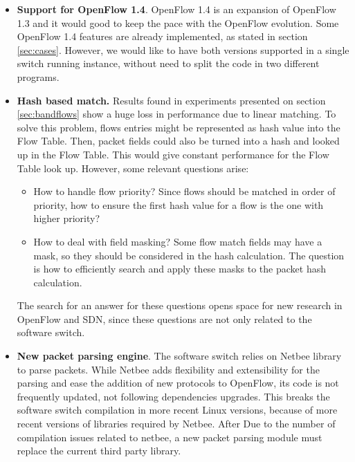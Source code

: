 \begin{itemize}

\item \textbf{Support for OpenFlow 1.4}. OpenFlow 1.4 is an expansion of OpenFlow 1.3 and it would good to keep the pace with the OpenFlow evolution. Some OpenFlow 1.4 features are already implemented, as stated in section \ref{sec:cases}. However, we would like to have both versions supported in a single switch running instance, without need to split the code in two different programs.

\item \textbf{Hash based match.} Results found in experiments presented on section \ref{sec:bandflows} show a huge loss in performance due to linear matching. To solve this problem, flows entries might be represented as hash value into the Flow Table. Then, packet fields could also be turned into a hash and looked up in the Flow Table. This would give constant performance for the Flow Table look up. However, some relevant questions arise: 

    \begin{itemize}
    \item How to handle flow priority? Since flows should be matched in order of priority, how to ensure the first hash value for a flow is the one with higher priority? 
    \item How to deal with field masking? Some flow match fields may have a mask, so they should be considered in the hash calculation. The question is how to efficiently search and apply these masks to the packet hash calculation. 
    \end{itemize}

The search for an answer for these questions opens space for new research in OpenFlow and SDN, since these questions are not only related to the software switch. 
  
\item \textbf{New packet parsing engine}. The software switch relies on Netbee library to parse packets. While Netbee adds flexibility and extensibility for the parsing and ease the addition of new protocols to OpenFlow, its code is not frequently updated, not following dependencies upgrades. This breaks the software switch compilation in more recent Linux versions, because of more recent versions of libraries required by Netbee. After   Due to the number of compilation issues related to netbee, a new packet parsing module must replace the current third party library.

\end{itemize}

